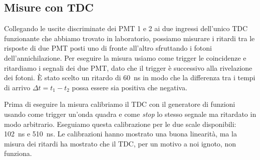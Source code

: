 \subsection{Misure con TDC}

Collegando le uscite discriminate dei PMT 1 e 2 ai due ingressi dell'unico TDC funzionante che abbiamo trovato in laboratorio, possiamo misurare i ritardi tra le risposte di due PMT posti uno di fronte all'altro sfruttando i fotoni dell'annichilazione. Per eseguire la misura usiamo come trigger le coincidenze e ritardiamo i segnali dei due PMT, dato che il trigger è successivo alla rivelazione dei fotoni. \`E stato scelto un ritardo di \SI{60}{ns} in modo che la differenza tra i tempi di arrivo $\Delta t=t_1-t_2$ possa essere sia positiva che negativa.

Prima di eseguire la misura calibriamo il TDC con il generatore di funzioni usando come trigger un'onda quadra e come \emph{stop} lo stesso segnale ma ritardato in modo arbitrario.
Eseguiamo questa calibrazione per le due scale disponibili: \SI{102}{ns} e \SI{510}{ns}.
Le calibrazioni hanno mostrato una buona linearità, ma la misura dei ritardi ha mostrato che il TDC, per un motivo a noi ignoto, non funziona.
